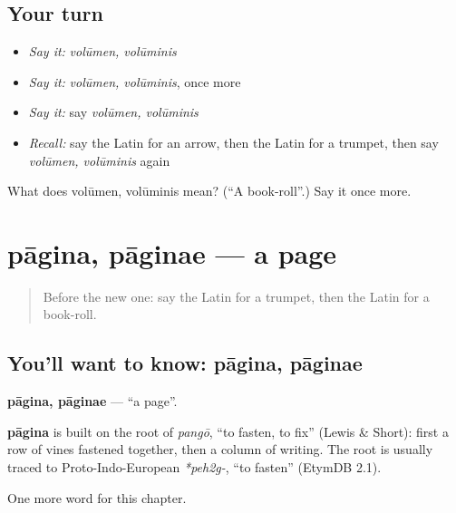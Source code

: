 \subsection*{Your turn}
\begin{itemize}
\raggedright
  \item \emph{Say it:} \emph{volūmen, volūminis}
  \item \emph{Say it:} \emph{volūmen, volūminis}, once more
  \item \emph{Say it:} say \emph{volūmen, volūminis}
  \item \emph{Recall:} say the Latin for an arrow, then the Latin for a trumpet, then say \emph{volūmen, volūminis} again
\end{itemize}

\begin{tcolorbox}[breakable,colback=teal!4,colframe=teal!35!black,title={Before you move on}]
What does volūmen, volūminis mean? (\textquotedblleft{}A book-roll\textquotedblright{}.) Say it once more.
\end{tcolorbox}
\section[pāgina, pāginae]{pāgina, pāginae — a page}

\label{lesson:LA-C278-pagina}



\begin{quote}
Before the new one: say the Latin for a trumpet, then the Latin for a book-roll.
\end{quote}

\subsection*{You'll want to know: pāgina, pāginae}
\textbf{pāgina, pāginae} — \textquotedblleft{}a page\textquotedblright{}.

\begin{cousinweb}
\textbf{pāgina} is built on the root of \emph{pangō}, \textquotedblleft{}to fasten, to fix\textquotedblright{} (Lewis \& Short): first a row of vines fastened together, then a column of writing. The root is usually traced to Proto-Indo-European \emph{*peh2g-}, \textquotedblleft{}to fasten\textquotedblright{} (EtymDB 2.1).
\end{cousinweb}

\begin{grammarlens}[title={What you've built}]
One more word for this chapter.
\end{grammarlens}

